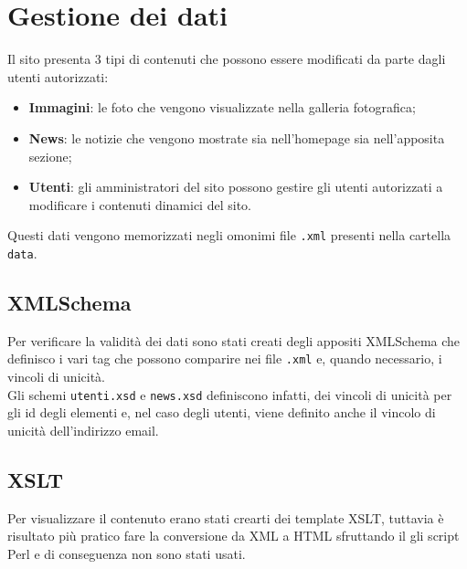 \section{Gestione dei dati}

Il sito presenta 3 tipi di contenuti che possono essere modificati da parte dagli utenti autorizzati:
\begin{itemize}
\item \textbf{Immagini}: le foto che vengono visualizzate nella galleria fotografica;
\item \textbf{News}: le notizie che vengono mostrate sia nell'homepage sia nell'apposita sezione;
\item \textbf{Utenti}: gli amministratori del sito possono gestire gli utenti autorizzati a modificare i contenuti dinamici del sito.
\end{itemize}
Questi dati vengono memorizzati negli omonimi file \texttt{.xml} presenti nella cartella \texttt{data}.

\subsection{XMLSchema}
Per verificare la validità dei dati sono stati creati degli appositi XMLSchema che definisco i vari tag che possono comparire nei file \texttt{.xml} e, quando necessario, i vincoli di unicità. \\
Gli schemi \texttt{utenti.xsd} e \texttt{news.xsd} definiscono infatti, dei vincoli di unicità per gli id degli elementi e, nel caso degli utenti, viene definito anche il vincolo di unicità dell'indirizzo email.

\subsection{XSLT}
Per visualizzare il contenuto erano stati crearti dei template XSLT, tuttavia è risultato più pratico fare la conversione da XML a HTML sfruttando il gli script Perl e di conseguenza non sono stati usati.


